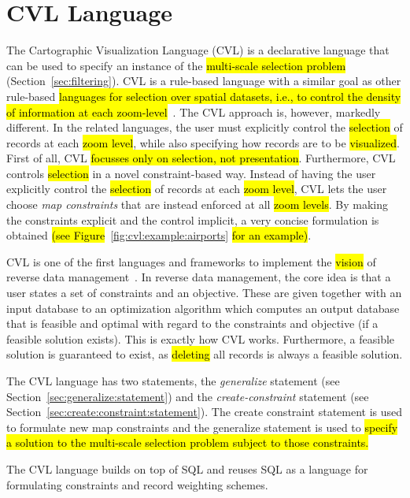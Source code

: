 \section{CVL Language}
\label{sec:cvl:language}
The Cartographic Visualization Language (CVL) is a declarative language that can be used to specify an instance of the \hl{multi-scale selection problem} (Section~\ref{sec:filtering}). CVL is a rule-based language with a similar goal as other rule-based \hl{languages for selection over spatial datasets, i.e., to control the density of information at each zoom-level}~\cite{sld,mapnik}. The CVL approach is, however, markedly different. In the related languages, the user must explicitly control the \hl{selection} of records at each \hl{zoom level}, while also specifying how records are to be \hl{visualized}. First of all, CVL \hl{focusses only on selection, not presentation}. Furthermore, CVL controls \hl{selection} in a novel constraint-based way. Instead of having the user explicitly control the \hl{selection} of records at each \hl{zoom level}, CVL lets the user choose \emph{map constraints} that are instead enforced at all \hl{zoom levels}. By making the constraints explicit and the control implicit, a very concise formulation is obtained \hl{(see Figure}~\ref{fig:cvl:example:airports}\hl{ for an example)}.

CVL is one of the first languages and frameworks to implement the \hl{vision} of reverse data management~\cite{meliou2011reverse}. In reverse data management, the core idea is that a user states a set of constraints and an objective. These are given together with an input database to an optimization algorithm which computes an output database that is feasible and optimal with regard to the constraints and objective (if a feasible solution exists). This is exactly how CVL works. Furthermore, a feasible solution is guaranteed to exist, as \hl{deleting} all records is always a feasible solution.

The CVL language has two statements, the \emph{generalize} statement (see Section~\ref{sec:generalize:statement}) and the \emph{create-constraint} statement (see Section~\ref{sec:create:constraint:statement}). The create constraint statement is used to formulate new map constraints and the generalize statement is used to \hl{specify a solution to the multi-scale selection problem subject to those constraints.} 

The CVL language builds on top of SQL and reuses SQL as a language for formulating constraints and record weighting schemes.


